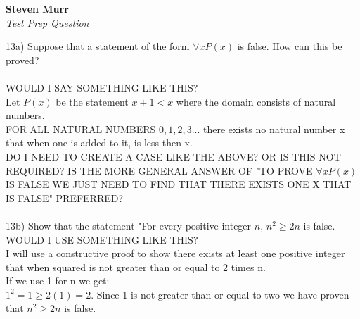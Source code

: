 \documentclass{article}
\begin{document}
\setcounter{totalnumber}{5}
   \begin{flushright}
      \Large\textbf{Steven Murr}\\
      \large\textit{Test Prep Question}\\
   \end{flushright}
\begin{flushleft}
\makeatletter%
\setlength{\@fptop}{5pt}
\makeatother

\setlength\parindent{0pt}13a) Suppose that a statement of the form $\forall x P(x)$ is false.  How can this be proved? \\
~\\
WOULD I SAY SOMETHING LIKE THIS? \\
Let $P(x) $ be the statement $x + 1 < x$ where the domain consists of natural numbers. \\
FOR ALL NATURAL NUMBERS ${ 0, 1, 2, 3...}$ there exists no natural number x that when one is added to it, is less then x. \\
DO I NEED TO CREATE A CASE LIKE THE ABOVE?  OR IS THIS NOT REQUIRED?  IS THE MORE GENERAL ANSWER OF "TO PROVE $\forall x P(x)$ IS FALSE WE JUST NEED TO FIND THAT THERE EXISTS ONE X THAT IS FALSE" PREFERRED?\\
~\\

\setlength\parindent{0pt}13b) Show that the statement "For every positive integer $n$, $n^2 \geq 2n$ is false.\\
WOULD I USE SOMETHING LIKE THIS? \\
I will use a constructive proof to show there exists at least one positive integer that when squared is not greater than or equal to 2 times n.  \\
If we use 1 for n we get: \\
$1^2 = 1 \geq 2(1) = 2$.  Since 1 is not greater than or equal to two we have proven that $n^2 \geq 2n$ is false.

\end{flushleft}
\end{document}
